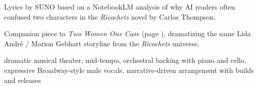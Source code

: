 
\label{sec:two-faces-in-the-ledger}
\begin{notes}
Lyrics by SUNO based on a NotebookLM analysis of why AI readers often confused two characters in the \emph{Ricochets} novel by Carlos Thompson.

Companion piece to \emph{Two Women One Case} (page \pageref{sec:two-women-one-case}), dramatizing the same Lida André / Marion Gebhart storyline from the \emph{Ricochets} universe.
\end{notes}
\begin{style}
dramatic musical theater, mid-tempo, orchestral backing with piano and cello, expressive Broadway-style male vocals, narrative-driven arrangement with builds and releases
\end{style}
